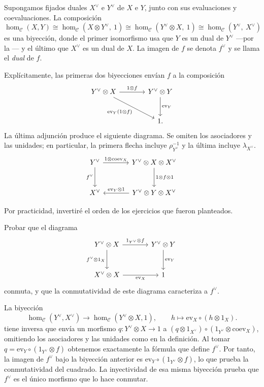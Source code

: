 Supongamos fijados duales $X^\vee$ e $Y^\vee$ de $X$ e $Y$, junto con sus evaluaciones y coevaluaciones. La composición
\[
\hom_{\mathcal C}(X,Y)\cong\hom_{\mathcal C}(X\otimes Y^\vee,\ 1)\cong\hom_{\mathcal C}(Y^\vee\otimes X,\ 1)\cong\hom_{\mathcal C}(Y^\vee,\ X^\vee)
\]
es una biyección, donde el primer isomorfismo usa que $Y$ es un dual de $Y^\vee$ —por la — y el último que $X^\vee$ es un dual de $X$. La imagen de $f$ se denota $f^\vee$ y se llama el \emph{dual} de $f$.

Explícitamente, las primeras dos biyecciones envían $f$ a la composición
\[
\begin{tikzcd}[column sep=large,row sep=large]
Y^\vee\otimes X \arrow[r,"{1\otimes f}"] \arrow[dr,"{\mathrm{ev}_Y(1\otimes f)}"']
 &Y^\vee\otimes Y \arrow[d,"{\mathrm{ev}_Y}"]\\
 &1 .
\end{tikzcd}
\]
La última adjunción produce el siguiente diagrama. Se omiten los asociadores y las unidades; en particular, la primera flecha incluye $\rho_{Y^\vee}^{-1}$ y la última incluye $\lambda_{X^\vee}$.
\[
\begin{tikzcd}[column sep=large,row sep=large]
Y^\vee \arrow[r,"{1\otimes\mathrm{coev}_X}"]
 \arrow[d,"{f^\vee}"']
 &Y^\vee\otimes X\otimes X^\vee \arrow[d,"{1\otimes f\otimes1}"]\\
X^\vee
 &Y^\vee\otimes Y\otimes X^\vee \arrow[l,"{\mathrm{ev}_Y\otimes1}"']
\end{tikzcd}
\]

Por practicidad, invertiré el orden de los ejercicios que fueron planteados.

\begin{ejer}
Probar que el diagrama
\[
\begin{tikzcd}[column sep=large,row sep=large]
Y^\vee\otimes X
    \arrow[r,"1_{Y^\vee}\otimes f"]
    \arrow[d,"f^\vee\otimes1_X"']
& Y^\vee\otimes Y \arrow[d,"\mathrm{ev}_Y"]\\
X^\vee\otimes X \arrow[r,"\mathrm{ev}_X"']
& 1
\end{tikzcd}
\]
conmuta, y que la conmutatividad de este diagrama caracteriza a $f^\vee$.
\end{ejer}
\begin{sol}
La biyección
\[
\hom_{\mathcal C}(Y^\vee,X^\vee)
\longrightarrow\hom_{\mathcal C}(Y^\vee\otimes X,1),
\qquad h\longmapsto\mathrm{ev}_X\circ(h\otimes1_X).
\]
tiene inversa que envía un morfismo $q\colon Y^\vee\otimes X\to1$ a $(q\otimes1_{X^\vee})\circ(1_{Y^\vee}\otimes\mathrm{coev}_X)$, omitiendo los asociadores y las unidades como en la definición. Al tomar $q=\mathrm{ev}_Y\circ(1_{Y^\vee}\otimes f)$ obtenemos exactamente la fórmula que define $f^\vee$. Por tanto, la imagen de $f^\vee$ bajo la biyección anterior es $\mathrm{ev}_Y\circ(1_{Y^\vee}\otimes f)$, lo que prueba la conmutatividad del cuadrado. La inyectividad de esa misma biyección prueba que $f^\vee$ es el único morfismo que lo hace conmutar.
\end{sol}

